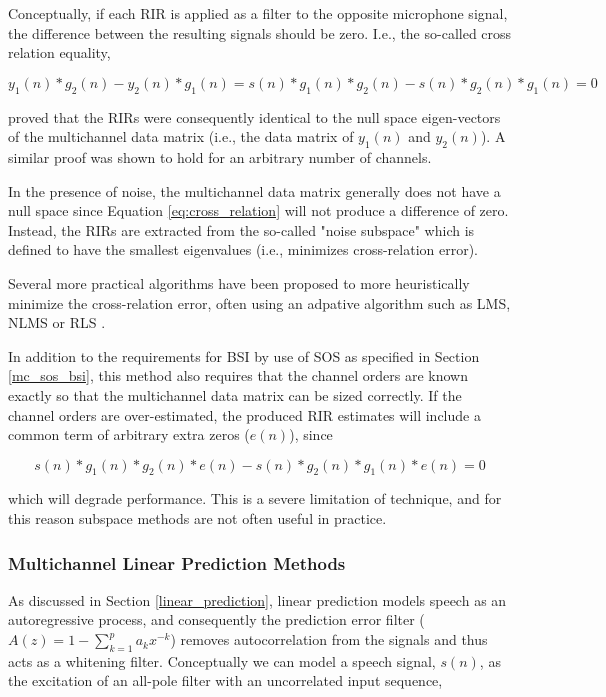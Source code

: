 Conceptually, if each RIR is applied as a filter to the opposite microphone signal, the difference between the resulting signals should be zero. I.e., the so-called cross relation equality,

\noindent
\begin{equation}
	y_1(n)*g_2(n) - y_2(n)*g_1(n) = s(n)*g_1(n)*g_2(n) - s(n)*g_2(n)*g_1(n) = 0 \label{eq:cross_relation}
\end{equation}

\cite{gurelli1995evam} proved that the RIRs were consequently identical to the null space eigen-vectors of the multichannel data matrix (i.e., the data matrix of $y_1(n)$ and $y_2(n)$). A similar proof was shown to hold for an arbitrary number of channels. 

In the presence of noise, the multichannel data matrix generally does not have a null space since Equation \ref{eq:cross_relation} will not produce a difference of zero. Instead, the RIRs are extracted from the so-called "noise subspace" which is defined to have the smallest eigenvalues (i.e., minimizes cross-relation error).

Several more practical algorithms have been proposed to more heuristically minimize the cross-relation error, often using an adpative algorithm such as LMS, NLMS or RLS \citep[][]{identification1995least, huang2003class, huang2002adaptive}.

In addition to the requirements for BSI by use of SOS as specified in Section \ref{mc_sos_bsi}, this method also requires that the channel orders are known exactly so that the multichannel data matrix can be sized correctly. If the channel orders are over-estimated, the produced RIR estimates will include a common term of arbitrary extra zeros ($e(n)$), since

\begin{equation}
	s(n)*g_1(n)*g_2(n)*e(n) - s(n)*g_2(n)*g_1(n)*e(n) = 0
\end{equation}

\noindent
which will degrade performance. This is a severe limitation of technique, and for this reason subspace methods are not often useful in practice.


\subsubsection{Multichannel Linear Prediction Methods} \label{section_dap}

As discussed in Section \ref{linear_prediction}, linear prediction models speech as an autoregressive process, and consequently the prediction error filter ($A(z)=1-\sum_{k=1}^{p}a_k x^{-k}$) removes autocorrelation from the signals and thus acts as a whitening filter. Conceptually we can model a speech signal, $s(n)$, as the excitation of an all-pole filter with an uncorrelated input sequence, 

